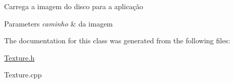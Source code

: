 \-Carrega a imagem do disco para a aplicação 
\begin{DoxyParams}{\-Parameters}
{\em caminho} & da imagem \\
\hline
\end{DoxyParams}


\-The documentation for this class was generated from the following files\-:\begin{DoxyCompactItemize}
\item 
\hyperlink{_texture_8h}{\-Texture.\-h}\item 
\-Texture.\-cpp\end{DoxyCompactItemize}
